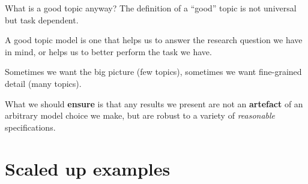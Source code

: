 \documentclass[
  10pt,
  ignorenonframetext,
  aspectratio=169]{beamer}
\begin{document}
\begin{frame}{What is a good topic anyway?}
\protect\hypertarget{what-is-a-good-topic-anyway}{}
The definition of a ``good'' topic is not universal but task dependent.

A good topic model is one that helps us to answer the research question
we have in mind, or helps us to better perform the task we have.

Sometimes we want the big picture (few topics), sometimes we want
fine-grained detail (many topics).

What we should \textbf{ensure} is that any results we present are not an
\textbf{artefact} of an arbitrary model choice we make, but are robust
to a variety of \emph{reasonable} specifications.
\end{frame}

\hypertarget{scaled-up-examples}{%
\section{Scaled up examples}\label{scaled-up-examples}}
\end{document}
